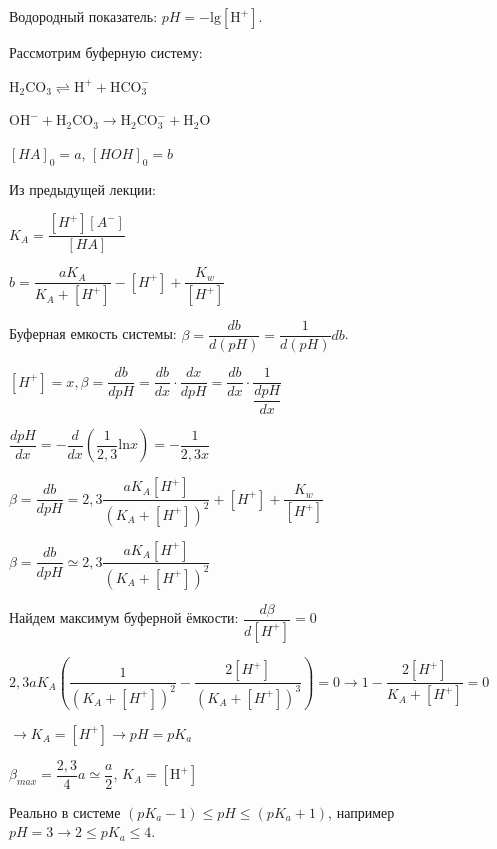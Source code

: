 
\begin{lecture}
	\begin{lecSection}
			\begin{definition}
			Водородный показатель: $pH = -\mathrm{lg}\left[\mathrm{H^+}\right]$.
		\end{definition}
	\begin{center}
	Рассмотрим буферную систему:
	\par $\mathrm{H_2CO_3 \rightleftharpoons H^+ + HCO_3^-}$
	\par $ \mathrm{OH^- + H_2CO_3 \rightarrow H_2CO_3^- + H_2O}$
	\par $ [HA]_0 = a $, $ [HOH]_0 = b $
	\par Из предыдущей лекции:
	\par $	K_A = \dfrac{[H^+] [A^-]}{[HA]}$
	\par $b = \dfrac{a K_A}{K_A + [H^+]} - [H^+] + \dfrac{ K_w }{ [H^+] }$
	\end{center}
	\begin{definition}
		Буферная емкость системы: $\beta = \dfrac{db}{d(pH)} = \dfrac{1}{d(pH)}{db}$.
	\end{definition}
	\begin{center}
	$[H^+] = x, \beta = \dfrac{db}{dpH} = \dfrac{db}{dx} \cdot \dfrac{dx}{dpH} = \dfrac{db}{dx} \cdot \dfrac{1}{\dfrac{dpH}{dx}}$
        \par $\dfrac{dpH}{dx} = - \dfrac{d}{dx}\left( \dfrac{1}{2,3}\mathrm{ln}x \right)  = - \dfrac{1}{2,3x}$
	\par $\beta = \dfrac{db}{dpH} = 2,3\dfrac{a K_A[H^+]}{(K_A + [H^+])^2} + [H^+] + \dfrac{ K_w }{ [H^+] }$
	\par $\beta = \dfrac{db}{dpH} \simeq 2,3 \dfrac{a K_A[H^+]}{(K_A + [H^+])^2}$
	\par Найдем максимум буферной ёмкости: $\dfrac{d\beta}{d[H^+]} = 0$
	\par $2,3aK_A\left(\dfrac{1}{(K_A+[H^+])^2}-\dfrac{2[H^+]}{(K_A + [H^+])^3}\right) = 0 \rightarrow 1-\dfrac{2[H^+]}{K_A + [H^+]} = 0$
	\par $\rightarrow K_A = [H^+] \rightarrow pH = pK_a$
	\par $\beta_{max} = \dfrac{2,3}{4}a \simeq \dfrac{a}{2}$, $K_A = [\mathrm{H^+}]$
	\par Реально в системе $(pK_a - 1) \leq pH \leq (pK_a + 1)$, например $pH = 3 \rightarrow 2 \leq pK_a \leq 4$.
	\end{center}

\end{lecSection}
\end{lecture}
